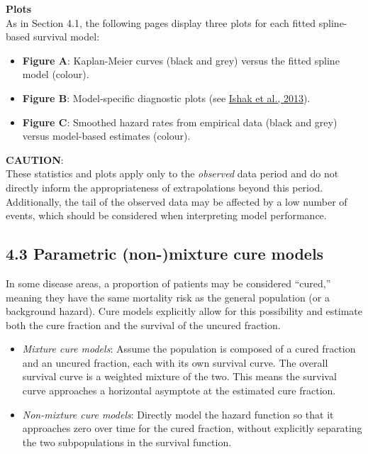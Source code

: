 \documentclass[
]{article}
\providecommand{\tightlist}{%
  \setlength{\itemsep}{0pt}\setlength{\parskip}{0pt}}
\begin{document}
\textbf{Plots}\\
As in Section 4.1, the following pages display three plots for each
fitted spline-based survival model:

\begin{itemize}
\tightlist
\item
  \textbf{Figure A}: Kaplan-Meier curves (black and grey) versus the
  fitted spline model (colour).\\
\item
  \textbf{Figure B}: Model-specific diagnostic plots (see
  \href{https://doi.org/10.1007/s40273-013-0064-3}{Ishak et al.,
  2013}).\\
\item
  \textbf{Figure C}: Smoothed hazard rates from empirical data (black
  and grey) versus model-based estimates (colour).
\end{itemize}

\textbf{CAUTION}:\\
These statistics and plots apply only to the \emph{observed} data period
and do not directly inform the appropriateness of extrapolations beyond
this period.\\
Additionally, the tail of the observed data may be affected by a low
number of events, which should be considered when interpreting model
performance.

\clearpage

\clearpage

\subsection{4.3 Parametric (non-)mixture cure
models}\label{parametric-non-mixture-cure-models}

In some disease areas, a proportion of patients may be considered
``cured,'' meaning they have the same mortality risk as the general
population (or a background hazard). Cure models explicitly allow for
this possibility and estimate both the cure fraction and the survival of
the uncured fraction.

\begin{itemize}
\tightlist
\item
  \emph{Mixture cure models}: Assume the population is composed of a
  cured fraction and an uncured fraction, each with its own survival
  curve. The overall survival curve is a weighted mixture of the two.
  This means the survival curve approaches a horizontal asymptote at the
  estimated cure fraction.\\
\item
  \emph{Non-mixture cure models}: Directly model the hazard function so
  that it approaches zero over time for the cured fraction, without
  explicitly separating the two subpopulations in the survival function.
\end{itemize}
\end{document}
